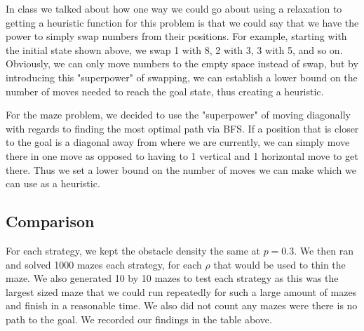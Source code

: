 \documentclass[11pt]{scrartcl} %
\begin{document}
 \vspace{2em}

In class we talked about how one way we could go about using a relaxation to getting a heuristic function for this problem is that we could say that we have the power to simply swap numbers from their positions. For example, starting with the initial state shown above, we swap 1 with 8, 2 with 3, 3 with 5, and so on. Obviously, we can only move numbers to the empty space instead of swap, but by introducing this "superpower" of swapping, we can establish a lower bound on the number of moves needed to reach the goal state, thus creating a heuristic.

\vspace{2em}
For the maze problem, we decided to use the "superpower" of moving diagonally with regards to finding the most optimal path via BFS. If a position that is closer to the goal is a diagonal away from where we are currently, we can simply move there in one move as opposed to having to 1 vertical and 1 horizontal move to get there. Thus we set a lower bound on the number of moves we can make which we can use as a heuristic.

\vspace{2em}

\subsection{Comparison}
For each strategy, we kept the obstacle density the same at $p = 0.3$. We then ran and solved 1000 mazes each strategy, for each $\rho$ that would be used to thin the maze. We also generated 10 by 10 mazes to test each strategy as this was the largest sized maze that we could run repeatedly for such a large amount of mazes and finish in a reasonable time. We also did not count any mazes were there is no path to the goal. We recorded our findings in the table above.
\end{document}
